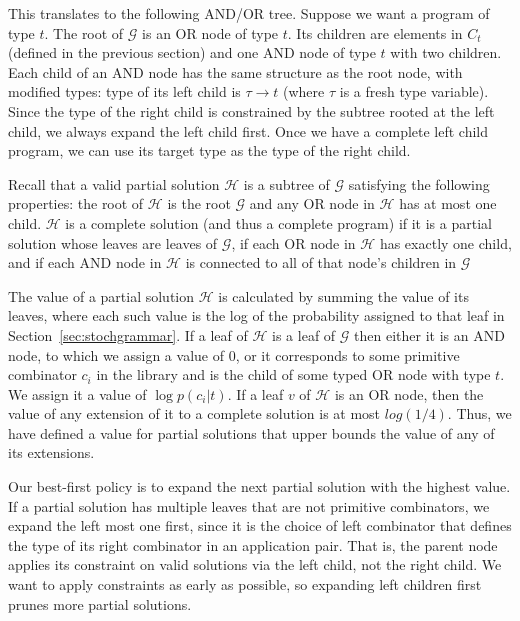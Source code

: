 \documentclass{article}
\begin{document}
This translates to the following AND/OR tree. Suppose we want a
program of type $t$. The root of $\mathcal{G}$ is an OR node of type
$t$. Its children are elements in $C_t$ (defined in the previous
section) and one AND node of type $t$ with two children. Each child of
an AND node has the same structure as the root node, with modified
types: type of its left child is $\tau \rightarrow t$ (where $\tau$ is
a fresh type variable). Since the type of the right child is
constrained by the subtree rooted at the left child, we always expand
the left child first. Once we have a complete left child program, we
can use its target type as the type of the right child. 

Recall that a valid partial solution $\mathcal{H}$ is a subtree of
$\mathcal{G}$ satisfying the following properties: the root of
$\mathcal{H}$ is the root $\mathcal{G}$ and any OR node in
$\mathcal{H}$ has at most one child. $\mathcal{H}$ is a complete
solution (and thus a complete program) if it is a partial solution
whose leaves are leaves of $\mathcal{G}$, if each OR node in
$\mathcal{H}$ has exactly one child, and if each AND node in
$\mathcal{H}$ is connected to all of that node's children in
$\mathcal{G}$

The value of a partial solution $\mathcal{H}$ is calculated by summing
the value of its leaves, where each such value is the log of the
probability assigned to that leaf in
Section~\ref{sec:stochgrammar}. If a leaf of $\mathcal{H}$ is a leaf
of $\mathcal{G}$ then either it is an AND node, to which we assign a
value of 0, or it corresponds to some primitive combinator $c_i$ in
the library and is the child of some typed OR node with type $t$. We
assign it a value of $\log{p(c_i | t)}$. If a leaf $v$ of
$\mathcal{H}$ is an OR node, then the value of any extension of it to
a complete solution is at most $log(1/4)$. Thus, we have defined a
value for partial solutions that upper bounds the value of any of its
extensions.

Our best-first policy is to expand the next partial solution
with the highest value. If a partial solution has multiple leaves that
are not primitive combinators, we expand the left most one first,
since it is the choice of left combinator that defines the type of its
right combinator in an application pair. That is, the parent node
applies its constraint on valid solutions via the left child, not the
right child. We want to apply constraints as early as possible, so
expanding left children first prunes more partial solutions.
\end{document}
